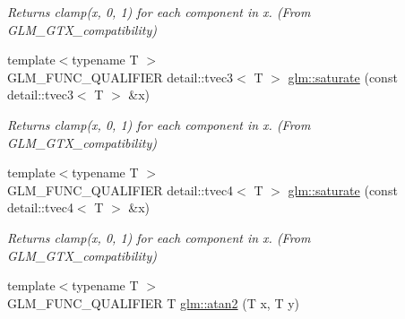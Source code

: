 \begin{DoxyCompactItemize}
\begin{DoxyCompactList}\small\item\em Returns clamp(x, 0, 1) for each component in x. (From G\+L\+M\+\_\+\+G\+T\+X\+\_\+compatibility) \end{DoxyCompactList}\item 
\hypertarget{group__gtx__compatibility_gaaa1fd467493e144ce1b2043c776afdcd}{}{\footnotesize template$<$typename T $>$ }\\G\+L\+M\+\_\+\+F\+U\+N\+C\+\_\+\+Q\+U\+A\+L\+I\+F\+I\+E\+R detail\+::tvec3$<$ T $>$ \hyperlink{group__gtx__compatibility_gaaa1fd467493e144ce1b2043c776afdcd}{glm\+::saturate} (const detail\+::tvec3$<$ T $>$ \&x)\label{group__gtx__compatibility_gaaa1fd467493e144ce1b2043c776afdcd}

\begin{DoxyCompactList}\small\item\em Returns clamp(x, 0, 1) for each component in x. (From G\+L\+M\+\_\+\+G\+T\+X\+\_\+compatibility) \end{DoxyCompactList}\item 
\hypertarget{group__gtx__compatibility_ga71c18fe8bc1e69c2b3c11feb13cf6695}{}{\footnotesize template$<$typename T $>$ }\\G\+L\+M\+\_\+\+F\+U\+N\+C\+\_\+\+Q\+U\+A\+L\+I\+F\+I\+E\+R detail\+::tvec4$<$ T $>$ \hyperlink{group__gtx__compatibility_ga71c18fe8bc1e69c2b3c11feb13cf6695}{glm\+::saturate} (const detail\+::tvec4$<$ T $>$ \&x)\label{group__gtx__compatibility_ga71c18fe8bc1e69c2b3c11feb13cf6695}

\begin{DoxyCompactList}\small\item\em Returns clamp(x, 0, 1) for each component in x. (From G\+L\+M\+\_\+\+G\+T\+X\+\_\+compatibility) \end{DoxyCompactList}\item 
\hypertarget{group__gtx__compatibility_gabdc84536daab78c6a169eeb93cf9cb3b}{}{\footnotesize template$<$typename T $>$ }\\G\+L\+M\+\_\+\+F\+U\+N\+C\+\_\+\+Q\+U\+A\+L\+I\+F\+I\+E\+R T \hyperlink{group__gtx__compatibility_gabdc84536daab78c6a169eeb93cf9cb3b}{glm\+::atan2} (T x, T y)\label{group__gtx__compatibility_gabdc84536daab78c6a169eeb93cf9cb3b}


\end{DoxyCompactItemize}
